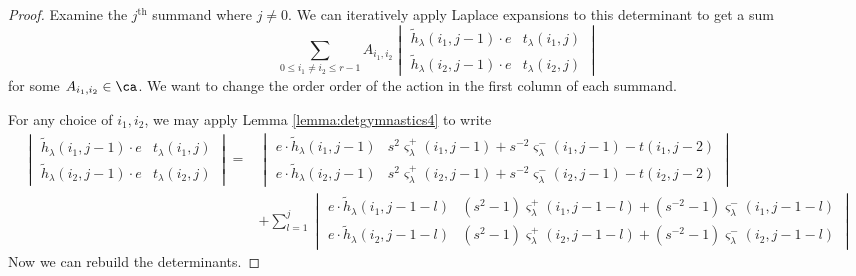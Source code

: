 \begin{proof}
Examine the $j^{\textrm{th}}$ summand where $j \neq 0$. We can iteratively apply Laplace expansions to this determinant to get a sum
\[
\sum_{0 \leq i_1 \neq i_2 \leq r-1} A_{i_1, i_2} 
\begin{vmatrix}
\tilde{h}_\lambda (i_1, j-1)\cdot e & t_\lambda (i_1, j) \\
\tilde{h}_\lambda (i_2, j-1)\cdot e & t_\lambda (i_2, j)
\end{vmatrix} 
\]
for some $A_{i_1, i_2} \in \ca$. We want to change the order order of the action in the first column of each summand.

For any choice of $i_1, i_2$, we may apply Lemma \ref{lemma:detgymnastics4} to write
\begin{align*}
\begin{vmatrix}
\tilde{h}_\lambda (i_1, j-1)\cdot e & t_\lambda (i_1, j) \\
\tilde{h}_\lambda (i_2, j-1)\cdot e & t_\lambda (i_2, j)
\end{vmatrix} 
=&
\begin{vmatrix}
e \cdot \tilde{h}_\lambda (i_1, j-1) & s^2 \varsigma_\lambda^+ (i_1, j-1) + s^{-2} \varsigma_\lambda^- (i_1, j-1) - t(i_1, j-2) \\
e \cdot \tilde{h}_\lambda (i_2, j-1) & s^2 \varsigma_\lambda^+ (i_2, j-1) + s^{-2} \varsigma_\lambda^- (i_2, j-1) - t(i_2, j-2) 
\end{vmatrix}\\
&+
\sum_{l=1}^{j}
\begin{vmatrix}
e \cdot \tilde{h}_\lambda(i_1, j-1-l) & (s^2 - 1) \varsigma_\lambda^+ (i_1, j-1-l) + (s^{-2} - 1) \varsigma_\lambda^- (i_1, j-1-l) \\
e \cdot \tilde{h}_\lambda(i_2, j-1-l) & (s^2 - 1) \varsigma_\lambda^+ (i_2, j-1-l) + (s^{-2} - 1) \varsigma_\lambda^- (i_2, j-1-l) 
\end{vmatrix}
\end{align*}
Now we can rebuild the determinants.
\end{proof}






